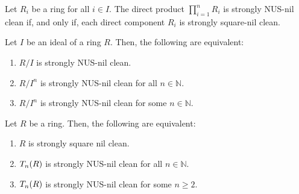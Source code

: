 \documentclass[10pt,a4paper]{amsart}
\begin{document}
\begin{lemma}\label{2.4}
Let $R_{i}$ be a ring for all $i\in I$. The direct product $\prod_{i=1}^{n} R_i$ is strongly NUS-nil clean if, and only if, each direct component $R_{i}$ is strongly square-nil clean.
\end{lemma}

\begin{corollary}\label{10}
Let $I$ be an ideal of a ring $R$. Then, the following are equivalent:
\begin{enumerate}
\item
$R/I$ is strongly NUS-nil clean.
\item
$R/I^n$	is strongly NUS-nil clean for all $n \in \mathbb{N}$.
\item
$R/I^n$ is strongly NUS-nil clean for some $n \in \mathbb{N}$.
\end{enumerate}	
\end{corollary}

\begin{proposition}\label{2.9}
Let $R$ be a ring. Then, the following are equivalent:
\begin{enumerate}
\item
$R$ is strongly square nil clean.
\item
${\rm T}_{n}(R)$ is strongly NUS-nil clean for all $n \in \mathbb{N}$.
\item
${\rm T}_n(R)$ is strongly NUS-nil clean for some $n \geq 2$.
\end{enumerate}
\end{proposition}
\end{document}
